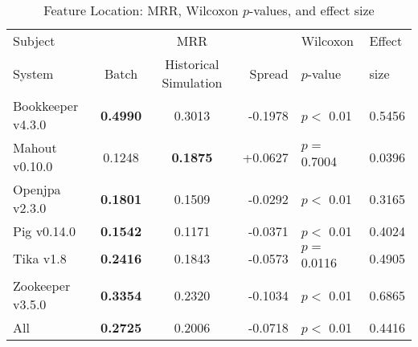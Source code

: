 \begin{table}[t]
\centering
\caption{Feature Location: MRR, Wilcoxon $p$-values, and effect size}
\begin{tabular}{l|ccr|ll}
\toprule
Subject & & MRR & & Wilcoxon & Effect \\
System  &  Batch & Historical Simulation & Spread & $p$-value & size \\
\midrule
Bookkeeper v4.3.0 & {\bf 0.4990 } & 0.3013 & -0.1978 & $p < $ 0.01 & 0.5456 \\
Mahout v0.10.0 & 0.1248 & {\bf 0.1875 } & +0.0627 & $p = $ 0.7004 & 0.0396 \\
Openjpa v2.3.0 & {\bf 0.1801 } & 0.1509 & -0.0292 & $p < $ 0.01 & 0.3165 \\
Pig v0.14.0 & {\bf 0.1542 } & 0.1171 & -0.0371 & $p < $ 0.01 & 0.4024 \\
Tika v1.8 & {\bf 0.2416 } & 0.1843 & -0.0573 & $p = $ 0.0116 & 0.4905 \\
Zookeeper v3.5.0 & {\bf 0.3354 } & 0.2320 & -0.1034 & $p < $ 0.01 & 0.6865 \\
\midrule
All & {\bf 0.2725 } & 0.2006 & -0.0718 & $p < $ 0.01 & 0.4416 \\
\bottomrule
\end{tabular}
\label{table:feature_location_rq2}
\end{table}
